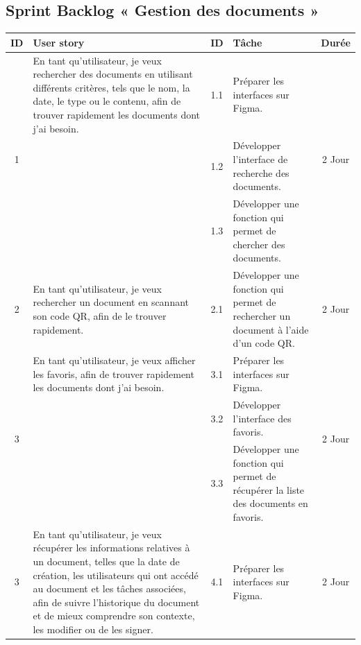 \pagebreak

\subsection{Sprint Backlog « Gestion des documents »}

\begin{adjustwidth}{-1cm}{}
    
    \begin{longtable}{|c|p{6cm}|c|p{6cm}|c|}
      \hline
      \textbf{ID} & \textbf{User story} & \textbf{ID}  & \textbf{Tâche} & \textbf{Durée} \\
      \hline
      \multirow{3}{*}{1} & En tant qu'utilisateur, je veux rechercher des documents en utilisant différents critères, tels que le nom, la date, le type ou le contenu, afin de trouver rapidement les documents dont j'ai besoin. & 1.1 & Préparer les interfaces sur Figma. & \multirow{3}{*}{2 Jour} \\
      \cline{3-4}
      & & 1.2 & Développer l'interface de recherche des documents. & \\
      \cline{3-4}
      & & 1.3 & Développer une fonction qui permet de chercher des documents. & \\
      \cline{1-5}
      2 & En tant qu'utilisateur, je veux rechercher un document en scannant son code QR, afin de le trouver rapidement. & 2.1 & Développer une fonction qui permet de rechercher un document à l'aide d'un code QR. & 2 Jour \\
      \cline{1-5}
      \multirow{3}{*}{3} & En tant qu'utilisateur, je veux afficher les favoris, afin de trouver rapidement les documents dont j'ai besoin.  & 3.1 & Préparer les interfaces sur Figma. & \multirow{3}{*}{2 Jour} \\
      \cline{3-4}
      & & 3.2 & Développer l'interface des favoris. & \\
      \cline{3-4}
      & & 3.3 & Développer une fonction qui permet de récupérer la liste des documents en favoris. & \\
      \cline{1-5}
      \multirow{4}{*}{3} & En tant qu'utilisateur, je veux récupérer les informations relatives à un document, telles que la date de création, les utilisateurs qui ont accédé au document et les tâches associées, afin de suivre l'historique du document et de mieux comprendre son contexte, les modifier ou de les signer. & 4.1 & Préparer les interfaces sur Figma. & \multirow{3}{*}{2 Jour} \\

\end{longtable}
\end{adjustwidth}
